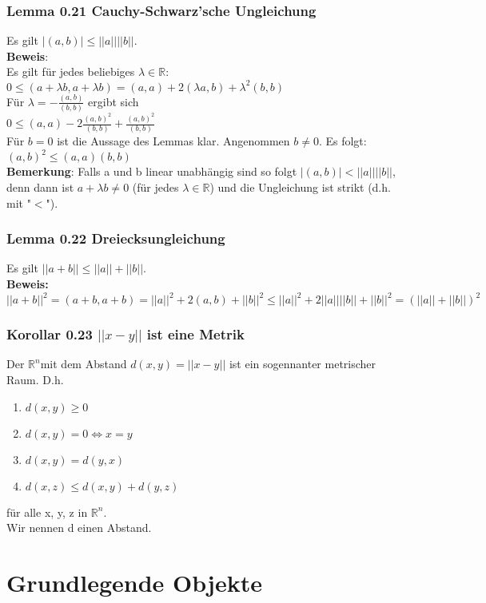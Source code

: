 \documentclass{article}
\newcommand{\lb}{\lambda}
\newcommand{\R}{\mathbb{R}}
\newcommand{\mRn}{$\mathbb{R}^n$}
\begin{document}
\subsubsection{Lemma 0.21 Cauchy-Schwarz'sche Ungleichung}
Es gilt $|(a, b)| \le ||a||||b||$.\\
\textbf{Beweis}:\\
Es gilt für jedes beliebiges $\lb \in \R$:\\
$0 \le (a + \lb b, a + \lb b) = (a, a) + 2 (\lb a, b) + \lb^2 (b, b)$\\
Für $\lb = -\frac{(a,b)}{(b, b)}$ ergibt sich\\
$0 \le (a, a) - 2 \frac{(a, b)^2}{(b, b)} + \frac{(a, b)^2}{(b, b)}$\\
Für $b = 0$ ist die Aussage des Lemmas klar. Angenommen $b \neq 0$. Es folgt:\\
$(a,b)^2 \le (a, a)(b,b)$\\
\textbf{Bemerkung}: Falls a und b linear unabhängig sind so folgt $|(a,b)| < ||a||||b||$, denn dann ist $a + \lb b \neq 0$ (für jedes $\lb \in \R$) und die Ungleichung ist strikt (d.h. mit "$<$").

\subsubsection{Lemma 0.22 Dreiecksungleichung}
Es gilt $||a+b|| \le ||a|| + ||b||$.\\
\textbf{Beweis:}\\
$ ||a+b||^2 = (a+b, a+b)= ||a||^2 + 2(a,b) + ||b||^2 \le ||a||^2 + 2 ||a||||b|| + ||b||^2 = (||a|| + ||b||)^2$

\subsubsection{Korollar 0.23 $||x-y||$ ist eine Metrik}
Der \mRn mit dem Abstand $d(x, y) = ||x - y||$ ist ein sogennanter metrischer Raum. D.h.
\begin{enumerate}
\item{
$d(x, y) \ge 0$}
\item{$d(x, y) = 0 \Leftrightarrow x = y$}
\item{$d(x, y) = d(y, x)$}
\item{$d(x, z) \le d(x,y) + d(y,z)$}
\end{enumerate}
für alle x, y, z in \mRn.\\
Wir nennen d einen Abstand.

\section{Grundlegende Objekte}
\end{document}
